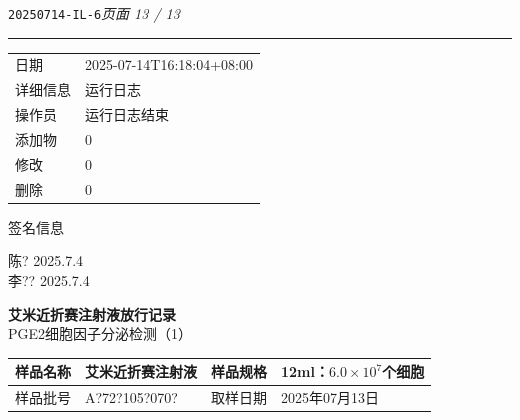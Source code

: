\documentclass[UTF8,10pt,a4paper,fontset=fandol]{ctexart}
\newcommand{\fieldvalue}[1]{#1}
\newcommand{\handwritten}[1]{#1}
\begin{document}

\newpage

\noindent\texttt{20250714-IL-6}\hfill\textit{页面 13 / 13}

\noindent\rule{\textwidth}{0.4pt}

\begin{tabular}{@{}ll@{}}
日期 & 
\fieldvalue{2025-07-14T16:18:04+08:00} \\[2pt]
详细信息 & 
\fieldvalue{运行日志} \\[2pt]
操作员 & 
\fieldvalue{运行日志结束} \\[2pt]
添加物 & 
\fieldvalue{0} \\[2pt]
修改 & 
\fieldvalue{0} \\[2pt]
删除 & 
\fieldvalue{0}
\end{tabular}

\medskip
签名信息

\vfill

\begin{flushright}
\handwritten{陈?}\quad
\handwritten{2025.7.4}\\[6pt]
\handwritten{李??}\quad
\handwritten{2025.7.4}
\end{flushright}

\newpage

\begin{center}
\textbf{艾米近折赛注射液放行记录}\\
PGE2细胞因子分泌检测（1）
\end{center}

\begin{tabularx}{\textwidth}{|l|X|l|X|}
\hline
样品名称 &
\fieldvalue{艾米近折赛注射液} &
样品规格 &
\fieldvalue{12ml：$6.0\times10^{7}$个细胞}
\\ \hline
样品批号 &
\fieldvalue{\handwritten{A?72?105?070?}} &
取样日期 &
\fieldvalue{\handwritten{2025年07月13日}}
\\ \hline
\end{tabularx}
\end{document}
